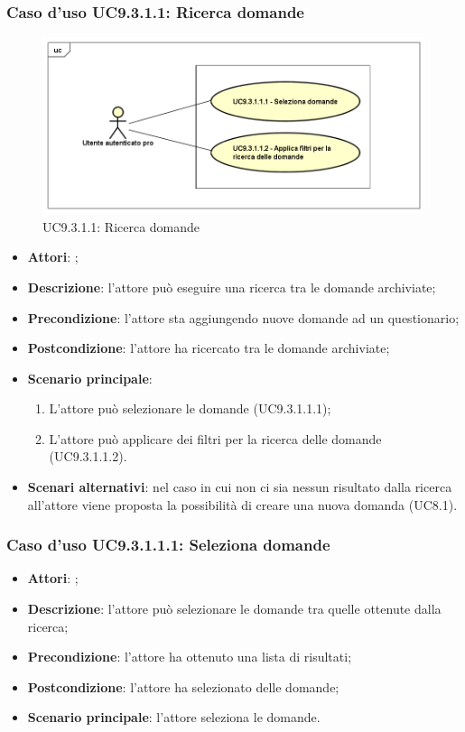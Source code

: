 		 \subsubsection{Caso d'uso UC9.3.1.1: Ricerca domande}
		 \label{UC9.3.1.1}
		 \begin{figure}[h]
		 	\centering
		 	\includegraphics[scale=0.5,keepaspectratio]{UML/UC9_3_1_1.png}
		 	\caption{UC9.3.1.1: Ricerca domande}
		 \end{figure}
		 \FloatBarrier
		 \begin{itemize}
		 	\item \textbf{Attori}: \uaupro{};
		 	\item \textbf{Descrizione}: l'attore può eseguire una ricerca tra le domande archiviate; 
		 	\item \textbf{Precondizione}: l'attore sta aggiungendo nuove domande ad un questionario;
		 	\item \textbf{Postcondizione}: l'attore ha ricercato tra le domande archiviate;
		 	\item \textbf{Scenario principale}:
		 	\begin{enumerate}
		 		\item L'attore può selezionare le domande (UC9.3.1.1.1); 
		 		\item L'attore può applicare dei filtri per la ricerca delle domande (UC9.3.1.1.2).
		 	\end{enumerate}
		 	\item \textbf{Scenari alternativi}: nel caso in cui non ci sia nessun risultato dalla ricerca all'attore viene proposta la possibilità di creare una nuova domanda (UC8.1).
		 \end{itemize}
		 
		 \subsubsection{Caso d'uso UC9.3.1.1.1: Seleziona domande}
		 \label{UC9.3.1.1.1}
		 \begin{itemize}
		 	\item \textbf{Attori}: \uaupro{};
		 	\item \textbf{Descrizione}: l'attore può selezionare le domande tra quelle ottenute dalla ricerca;
		 	\item \textbf{Precondizione}: l'attore ha ottenuto una lista di risultati;
		 	\item \textbf{Postcondizione}: l'attore ha selezionato delle domande; 
		 	\item \textbf{Scenario principale}: l'attore seleziona le domande.
		 \end{itemize}
		 

